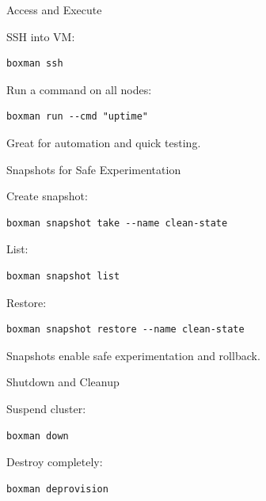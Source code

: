 \documentclass[aspectratio=169]{beamer}
\begin{document}

\begin{frame}[fragile]{Access and Execute}

SSH into VM:

\begin{lstlisting}
boxman ssh 
\end{lstlisting}

Run a command on all nodes:

\begin{lstlisting}
boxman run --cmd "uptime"
\end{lstlisting}

Great for automation and quick testing.

\end{frame}


\begin{frame}[fragile]{Snapshots for Safe Experimentation}

Create snapshot:

\begin{lstlisting}
boxman snapshot take --name clean-state
\end{lstlisting}

List:

\begin{lstlisting}
boxman snapshot list
\end{lstlisting}

Restore:

\begin{lstlisting}
boxman snapshot restore --name clean-state
\end{lstlisting}

Snapshots enable safe experimentation and rollback.

\end{frame}


\begin{frame}[fragile]{Shutdown and Cleanup}

Suspend cluster:

\begin{lstlisting}
boxman down
\end{lstlisting}

Destroy completely:

\begin{lstlisting}
boxman deprovision
\end{lstlisting}

\end{frame}
\end{document}

